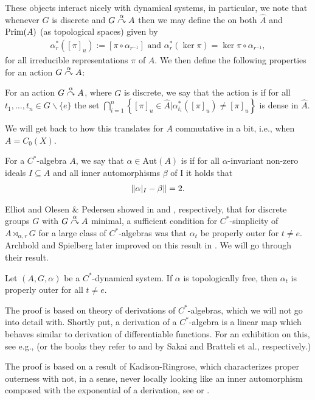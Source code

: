 These objects interact nicely with dynamical systems, in particular, we note that whenever $G$ is discrete and $G \stackrel{\alpha}{\curvearrowright} A$ then we may define the  on both $\hat A$ and $\mathrm{Prim}(A)$ (as topological spaces) given by
\begin{align*}
	\alpha_r^*([\pi]_u) := [\pi \circ \alpha_{r^{-1}}] \text{ and } \alpha_{r}^*(\ker \pi) = \ker \pi \circ \alpha_{r^{-1}},
\end{align*}
for all irreducible representations $\pi$ of $A$. We then define the following properties for an action $ G \stackrel{\alpha}{\curvearrowright} A$:
\begin{definition}
	For an action $G \stackrel{\alpha}{\curvearrowright} A$, where $G$ is discrete, we say that the action is  if for all $t_1,\dots,t_n \in G\backslash\{e\}$ the set $\bigcap_{i=1}^n \left\{ [\pi]_u \in \hat A | \alpha_{t_i}^*([\pi]_u)\neq [\pi]_u \right\}$ is dense in $\hat A$.
\end{definition}
We will get back to how this translates for $A$ commutative in a bit, i.e., when $A=C_0(X)$. 
\begin{definition}
	For a $C^*$-algebra $A$, we say that $\alpha \in \mathrm{Aut}(A)$ is  if for all $\alpha$-invariant non-zero ideals $I \subseteq A$ and all inner automorphisms $\beta$ of I it holds that
	\begin{align*}
		\left\lVert \alpha|_I - \beta \right\rVert = 2.
	\end{align*}
\end{definition}
Elliot and Olesen \& Pedersen showed in \cite[Theorem 3.2]{elliott1980some} and \cite[Theorem 7.2]{olesenpedersen3}, respectively, that for discrete groups $G$ with $G \stackrel{\alpha}{\curvearrowright} A$ minimal, a sufficient condition for $C^*$-simplicity of $A \rtimes_{\alpha,r} G$ for a large class of $C^*$-algebras was that $\alpha_t$ be properly outer for $t \neq e$. Archbold and Spielberg later improved on this result in \cite{archbold1994topologically}. We will go through their result. 
\begin{proposition}
	Let $(A,G,\alpha)$ be a $C^*$-dynamical system. If $\alpha$ is topologically free, then $\alpha_t$ is properly outer for all $t \neq e$.
\end{proposition}
\begin{remark}
	The proof is based on theory of derivations of $C^*$-algebras, which we will not go into detail with. Shortly put, a derivation of a $C^*$-algebra is a linear map which behaves similar to derivation of differentiable functions. For an exhibition on this, see e.g., \cite[Chapter 8.6]{pedersenalgauto} (or the books they refer to \cite{sakai1978recent} and \cite{bratteli2012operator} by Sakai and Bratteli et al., respectively.) 

	The proof is based on a result of Kadison-Ringrose, which characterizes proper outerness with not, in a sense, never locally looking like an inner automorphism composed with the exponential of a derivation, see \cite{kadison1967derivations} or \cite[Theorem 6.6 (i) and (ii)]{olesenpedersen3}.
\end{remark}

